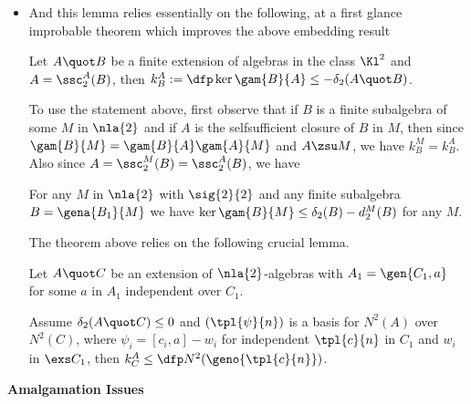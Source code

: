 \documentclass[a4paper,11pt,german,english]{report}
\begin{document}
\begin{itemize}

\item[]And this lemma relies essentially on the following,
at a first glance improbable theorem which improves the above
embedding result
\begin{teo*}
Let $A\quot B$ be a finite extension of algebras in the class $\Kl^{2}$ and $A=\ssc_{2}^{A}(B)$, then $k_{B}^{A}:=\dfp\ker\gam{B}{A}\leq-\delta_{2}(A\quot B)$.
\end{teo*}
To use the statement above, first observe
that if $B$ is a finite subalgebra of some $M$ in $\nla{2}$ and if $A$ is the selfsufficient closure  
of $B$ in $M$, then since $\gam{B}{M}
=\gam{B}{A}\gam{A}{M}$ and $A\zsu M$, we have $k_{B}^{M}=k_{B}^{A}$.
Also since $A=\ssc_{2}^{M}(B)=\ssc_{2}^{A}(B)$, we have
\begin{cor*}
For any $M$ in $\nla{2}$ with $\sig{2}{2}$ and any finite subalgebra $B=\gena{B_{1}}{M}$
we have $\ker\gam{B}{M}\leq\delta_{2}(B)-d_{2}^{M}(B)$ for any $M$.
\end{cor*}

The theorem above relies on the following crucial lemma.
\begin{lem*}
Let $A\quot C$ be an extension of $\nla{2}$-algebras with %
$A_{1}=\gen{C_{1},a}$ for some $a$ in $A_{1}$ independent over $C_{1}$.

Assume $\delta_{2}(A\quot C)\leq0$ and $\left(\tpl{\psi}{n}\right)$ is a basis
for $N^{2}(A)$ over $N^{2}(C)$, where $\psi_{i}=[c_{i},a]-w_{i}$ for independent $\tpl{c}{n}$ in
$C_{1}$ and $w_{i}$ in $\exs C_{1}$, then $k_{C}^{A}\leq\dfp N^{2}(\geno{\tpl{c}{n}})$.
\end{lem*}
\end{itemize}
\indent
{\bf Amalgamation Issues}
\end{document}

